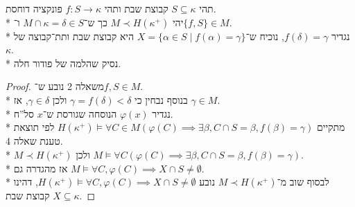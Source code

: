 \question{}
תהי $S \subseteq \kappa$ קבוצת שבת ותהי $f : S \to \kappa$ פונקציה דוחסת. \\*
יהי $M \prec H(\kappa^+)$ כך ש־$M \cap \kappa = \delta \in S$ ו־$\{f, S\} \in M$. \\*
נגדיר $f(\delta) = \gamma$, נוכיח ש־$X = \{ \alpha \in S \mid f(\alpha) = \gamma \}$ היא קבוצת שבת ותת־קבוצה של $\kappa$. \\*
נסיק שהלמה של פודור חלה.
\begin{proof}
	משאלה 2 נובע ש־$f, S \in M$. \\*
	בנוסף נבחין כי $\gamma = f(\delta) < \delta$ ולכן $\gamma \in \delta$, אז $\gamma \in M$. \\*
	נגדיר $\varphi(x)$ הנוסחה שגורסת ש־$x$ סל''ח. \\*
	מתקיים $H(\kappa^+) \models \forall C \in M (\varphi(C) \implies \exists \beta, C \cap S = \beta, f(\beta) = \gamma)$ לפי תוצאת טענת שאלה 4. \\*
	$M \prec H(\kappa^+)$ ולכן $M \models \forall C (\varphi(C) \implies \exists \beta, C \cap S = \beta, f(\beta) = \gamma)$. \\*
	אז מהגדרה גם $M \models \forall C, \varphi(C) \implies X \cap S \ne \emptyset$. \\*
	לבסוף שוב מ־$M \prec H(\kappa^+)$ נובע $H(\kappa^+) \models \forall C, \varphi(C) \implies X \cap S \ne \emptyset$, דהינו $X \subseteq \kappa$ קבוצת שבת.
\end{proof}


